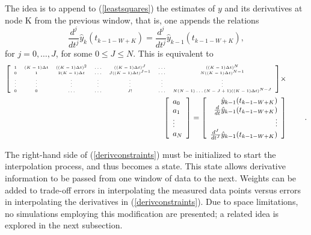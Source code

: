 The idea is to append to (\ref{leastsquares}) the estimates of $y$ and
its derivatives at node K from the previous window, that is, one appends
the relations
\begin{equation}
\frac{d^j}{dt^j} \hat{y}_k(t_{k-1-W+K}) =  \frac{d^j}{dt^j} \hat{y}_{k-1}(t_{k-1-W+K}),
\label{derivconstraints}
\end{equation}
for $j=0, \ldots, J$, for some $0 \le J \le N$.
This is equivalent to
\begin{eqnarray} {\tiny
\left[ \begin{array}{ccccccc} 
1 & (K-1) \Delta t & ((K-1)\Delta t)^2 & \ldots & ((K-1) \Delta t)^J & 
\ldots & ((K-1) \Delta t)^N \\
0 & 1 & 2(K-1) \Delta t & \ldots & J((K-1) \Delta t)^{J-1} & \ldots & 
N((K-1) \Delta t)^{N-1} \\
\vdots & \vdots & \vdots & \vdots & \vdots & \vdots & \vdots \\
0 & 0 & \ldots & \ldots & J! & \ldots & N(N-1)\ldots(N-J+1)((K-1) \Delta t)^{N-J}
\end{array} \right] } \times & \mbox{ } &  \nonumber \\
\left[ \begin{array}{l} a_0 \\ a_1 \\ \vdots \\ a_N \end{array} \right] 
 =  \left[ \begin{array}{r} 
\hat{y}_{k-1}(t_{k-1-W+K}) \\
\frac{d}{dt} \hat{y}_{k-1}(t_{k-1-W+K}) \\ 
\vdots \\ 
\frac{d^J}{dt^J} \hat{y}_{k-1}(t_{k-1-W+K})
\end{array} \right] & \mbox{\hspace*{.2in}} &.
\label{matrixderivconstraints}
\end{eqnarray}

The right-hand side of (\ref{derivconstraints}) must be initialized to
start the interpolation process, and thus becomes a state.  This state 
allows derivative 
information to be passed from one window of data 
to the next.   
Weights can be added to trade-off errors in interpolating the measured data points
versus errors in interpolating the derivatives in (\ref{derivconstraints}). 
Due to space limitations, no simulations employing this
modification are presented; a related idea is explored in the next subsection.

